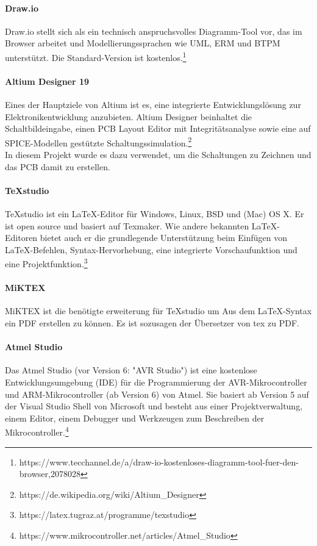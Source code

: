 \documentclass[paper=a4, 12pt]{scrreprt}
\begin{document}
	\paragraph{Draw.io}\hfill \break
	Draw.io stellt sich als ein technisch anspruchsvolles Diagramm-Tool vor, das im Browser arbeitet und Modellierungssprachen wie UML, ERM und BTPM unterstützt. Die Standard-Version ist kostenlos.\footnote{https://www.tecchannel.de/a/draw-io-kostenloses-diagramm-tool-fuer-den-browser,2078028}
	\paragraph{Altium Designer 19}\hfill \break
	Eines der Hauptziele von Altium ist es, eine integrierte Entwicklungslösung zur Elektronikentwicklung anzubieten.
	Altium Designer beinhaltet die Schaltbildeingabe, einen PCB Layout Editor mit Integritätsanalyse sowie eine auf SPICE-Modellen gestützte Schaltungssimulation.\footnote{https://de.wikipedia.org/wiki/Altium\_Designer}\\
	In diesem Projekt wurde es dazu verwendet, um die Schaltungen zu Zeichnen und das PCB damit zu erstellen.
	\paragraph{TeXstudio}\hfill \break
	TeXstudio ist ein LaTeX-Editor für Windows, Linux, BSD und (Mac) OS X. Er ist open source und basiert auf Texmaker. Wie andere bekannten LaTeX-Editoren bietet auch er die grundlegende Unterstützung beim Einfügen von LaTeX-Befehlen, Syntax-Hervorhebung, eine integrierte Vorschaufunktion und eine Projektfunktion.\footnote{https://latex.tugraz.at/programme/texstudio}
	\paragraph{MiKTEX}\hfill \break
	MiKTEX ist die benötigte erweiterung für TeXstudio um Aus dem LaTeX-Syntax ein PDF erstellen zu können. Es ist sozusagen der Übersetzer von tex zu PDF. \newpage
	\paragraph{Atmel Studio}\hfill \break
	Das Atmel Studio (vor Version 6: "AVR Studio") ist eine kostenlose Entwicklungsumgebung (IDE) für die Programmierung der AVR-Mikrocontroller und ARM-Mikrocontroller (ab Version 6) von Atmel. Sie basiert ab Version 5 auf der Visual Studio Shell von Microsoft und besteht aus einer Projektverwaltung, einem Editor, einem Debugger und Werkzeugen zum Beschreiben der Mikrocontroller.\footnote{https://www.mikrocontroller.net/articles/Atmel\_Studio}
\end{document}
